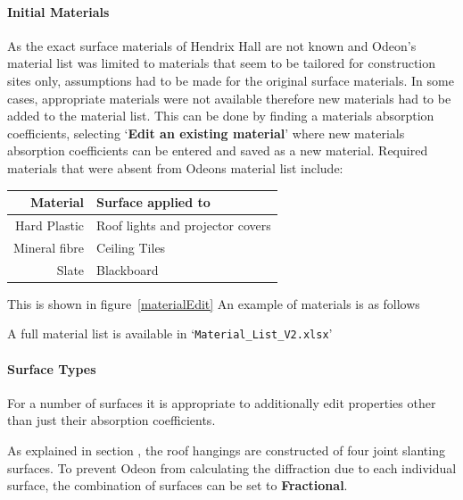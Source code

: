 \documentclass[../../main.tex]{subfiles}
\begin{document}
		\paragraph{Initial Materials}
			As the exact surface materials of Hendrix Hall are not known and Odeon's material list was limited to materials that seem to be tailored for construction sites only, assumptions had to be made for the original surface materials. In some cases, appropriate materials were not available therefore new materials had to be added to the material list. This can be done by finding a materials absorption coefficients, selecting `\textbf{Edit an existing material}' where new materials absorption coefficients can be entered and saved as a new material. Required materials that were absent from Odeons material list include:

			\begin{center}
				\begin{tabular}{r l}
					\textbf{Material} & \textbf{Surface applied to} \\ \hline
					Hard Plastic \footnotemark & Roof lights and projector covers \\
					Mineral fibre \footnotemark & Ceiling Tiles \\
					Slate \cite{Kovalchik} & Blackboard \\
				\end{tabular}
			\end{center}


			 This is shown in figure~\ref{materialEdit}
			 An example of materials is as follows

			 A full material list is available in `\texttt{Material\_List\_V2.xlsx}'

		\paragraph{Surface Types}

			For a number of surfaces it is appropriate to additionally edit properties other than just their absorption coefficients.

			As explained in section , the roof hangings are constructed of four joint slanting surfaces. To prevent Odeon from calculating the diffraction due to each individual surface, the combination of surfaces can be set to \textbf{Fractional}.
\end{document}
